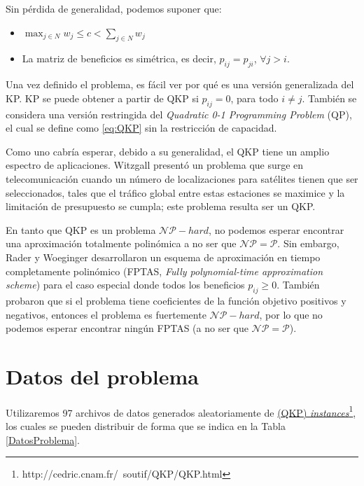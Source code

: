 Sin pérdida de generalidad, podemos suponer que:
\begin{itemize}
	\item $\max_{j\in N} w_j \leq c < \sum_{j\in N}w_j$
	\item La matriz de beneficios es simétrica, es decir, $p_{ij} = p_{ji}$, $\forall j > i$.
\end{itemize}

Una vez definido el problema, es fácil ver por qué es una versión generalizada del KP. 
KP se puede obtener a partir de QKP si $p_{ij} = 0$, para todo $i\neq j$. 
También se considera una versión restringida del \textit{Quadratic 0-1 Programming Problem} (QP), el cual se define como \ref{eq:QKP} sin la restricción de capacidad.

Como uno cabría esperar, debido a su generalidad, el QKP tiene un amplio espectro de aplicaciones. 
Witzgall \parencite{witzgallMathematicalMethodsSite1975} presentó un problema que surge en telecomunicación cuando un número de localizaciones para satélites tienen que ser seleccionados, tales que el tráfico global entre estas estaciones se maximice y la limitación de presupuesto se cumpla; este problema resulta ser un QKP. 

En tanto que QKP es un problema $\mathcal{NP}-hard$, no podemos esperar encontrar una aproximación totalmente polinómica a no ser que $\mathcal{NP}=\mathcal{P}$. 
Sin embargo, Rader y Woeginger \parencite{raderjrQuadraticKnapsackProblem2002}
desarrollaron un esquema de aproximación en tiempo completamente polinómico (FPTAS, \textit{Fully polynomial-time approximation scheme}) para el caso especial donde todos los beneficios $p_{ij}\geq 0$. 
También probaron que si el problema tiene coeficientes de la función objetivo positivos y negativos, entonces el problema es fuertemente $\mathcal{NP}-hard$, por lo que no podemos esperar encontrar ningún FPTAS (a no ser que $\mathcal{NP}=\mathcal{P}$).

\section{Datos del problema}

Utilizaremos 97 archivos de datos generados aleatoriamente de \href{http://cedric.cnam.fr/~soutif/QKP/QKP.html}{(QKP) \textit{instances}}\footnote{http://cedric.cnam.fr/~soutif/QKP/QKP.html}, los cuales se pueden distribuir de forma que se indica en la Tabla \ref{DatosProblema}.

